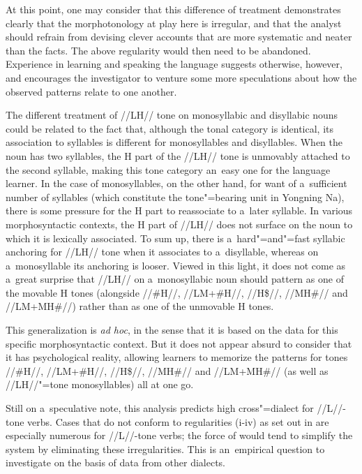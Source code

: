 At this point, one may consider that this difference of treatment demonstrates clearly
that the morphotonology at play here is irregular, and that the analyst should refrain from devising
clever accounts that are more systematic and neater than the facts. The above regularity would then need to be abandoned. Experience in learning and speaking the language suggests otherwise, however, and encourages the investigator to venture some more speculations about how the observed patterns relate to one another. 

The different treatment of \mbox{//LH//} tone on {monosyllabic} and disyllabic nouns could be related
to the fact that, although the tonal category is identical, its association to syllables is
different for monosyllables and disyllables. When the noun has two syllables, the H part of the
\mbox{//LH//} tone is unmovably attached to the second syllable, making this tone category an~easy
one for the language learner. In the case of monosyllables, on the other hand, for want of
a~sufficient number of syllables (which constitute the tone"=bearing unit in Yongning Na), there is some pressure for the H part to reassociate to
a~later syllable. In various morphosyntactic contexts, the H part of \mbox{//LH//} does not surface on the
noun to which it is lexically associated. To sum up, there is a~hard"=and"=fast syllabic
anchoring for \mbox{//LH//} tone when it associates to a~disyllable, whereas on a~monosyllable its anchoring is looser. Viewed in this light, it does not come as a~great surprise that \mbox{//LH//} on a~{monosyllabic} noun
should pattern as one of the movable H tones (alongside \mbox{//\#H//}, //LM+\#H//, \mbox{//H\$//}, \mbox{//MH\#//} and //LM+MH\#//) rather than as one of the unmovable H tones.

This generalization is \textit{ad hoc}, in the sense that it is based on the data for this specific
morphosyntactic context. But it does not appear absurd to consider that it has psychological
reality, allowing learners to memorize the patterns for tones \mbox{//\#H//}, //LM+\#H//, \mbox{//H\$//}, \mbox{//MH\#//} and //LM+MH\#// (as well as \mbox{//LH//}"=tone monosyllables) all at one go.

Still on a~speculative note, this analysis predicts high cross"=dialect  for //L//-tone verbs. Cases that do not conform to regularities (i-iv) as set out in  are especially numerous for //L//-tone verbs; the force of  would tend to simplify the system by
eliminating these irregularities. This is an~empirical {question} to investigate on the basis of data from other dialects.


